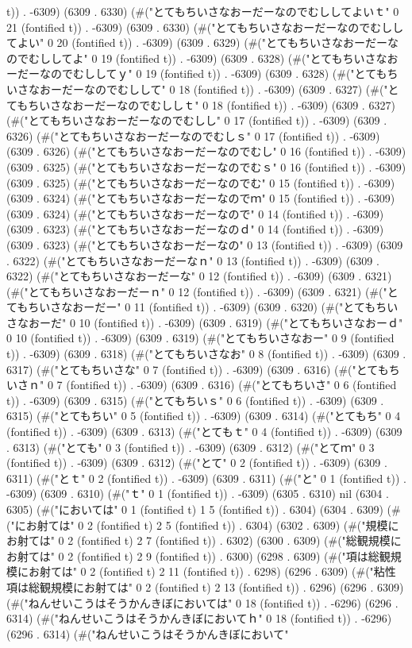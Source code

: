 t)) . -6309) (6309 . 6330) (#("とてもちいさなおーだーなのでむししてよいｔ" 0 21 (fontified t)) . -6309) (6309 . 6330) (#("とてもちいさなおーだーなのでむししてよい" 0 20 (fontified t)) . -6309) (6309 . 6329) (#("とてもちいさなおーだーなのでむししてよ" 0 19 (fontified t)) . -6309) (6309 . 6328) (#("とてもちいさなおーだーなのでむししてｙ" 0 19 (fontified t)) . -6309) (6309 . 6328) (#("とてもちいさなおーだーなのでむしして" 0 18 (fontified t)) . -6309) (6309 . 6327) (#("とてもちいさなおーだーなのでむししｔ" 0 18 (fontified t)) . -6309) (6309 . 6327) (#("とてもちいさなおーだーなのでむしし" 0 17 (fontified t)) . -6309) (6309 . 6326) (#("とてもちいさなおーだーなのでむしｓ" 0 17 (fontified t)) . -6309) (6309 . 6326) (#("とてもちいさなおーだーなのでむし" 0 16 (fontified t)) . -6309) (6309 . 6325) (#("とてもちいさなおーだーなのでむｓ" 0 16 (fontified t)) . -6309) (6309 . 6325) (#("とてもちいさなおーだーなのでむ" 0 15 (fontified t)) . -6309) (6309 . 6324) (#("とてもちいさなおーだーなのでｍ" 0 15 (fontified t)) . -6309) (6309 . 6324) (#("とてもちいさなおーだーなので" 0 14 (fontified t)) . -6309) (6309 . 6323) (#("とてもちいさなおーだーなのｄ" 0 14 (fontified t)) . -6309) (6309 . 6323) (#("とてもちいさなおーだーなの" 0 13 (fontified t)) . -6309) (6309 . 6322) (#("とてもちいさなおーだーなｎ" 0 13 (fontified t)) . -6309) (6309 . 6322) (#("とてもちいさなおーだーな" 0 12 (fontified t)) . -6309) (6309 . 6321) (#("とてもちいさなおーだーｎ" 0 12 (fontified t)) . -6309) (6309 . 6321) (#("とてもちいさなおーだー" 0 11 (fontified t)) . -6309) (6309 . 6320) (#("とてもちいさなおーだ" 0 10 (fontified t)) . -6309) (6309 . 6319) (#("とてもちいさなおーｄ" 0 10 (fontified t)) . -6309) (6309 . 6319) (#("とてもちいさなおー" 0 9 (fontified t)) . -6309) (6309 . 6318) (#("とてもちいさなお" 0 8 (fontified t)) . -6309) (6309 . 6317) (#("とてもちいさな" 0 7 (fontified t)) . -6309) (6309 . 6316) (#("とてもちいさｎ" 0 7 (fontified t)) . -6309) (6309 . 6316) (#("とてもちいさ" 0 6 (fontified t)) . -6309) (6309 . 6315) (#("とてもちいｓ" 0 6 (fontified t)) . -6309) (6309 . 6315) (#("とてもちい" 0 5 (fontified t)) . -6309) (6309 . 6314) (#("とてもち" 0 4 (fontified t)) . -6309) (6309 . 6313) (#("とてもｔ" 0 4 (fontified t)) . -6309) (6309 . 6313) (#("とても" 0 3 (fontified t)) . -6309) (6309 . 6312) (#("とてｍ" 0 3 (fontified t)) . -6309) (6309 . 6312) (#("とて" 0 2 (fontified t)) . -6309) (6309 . 6311) (#("とｔ" 0 2 (fontified t)) . -6309) (6309 . 6311) (#("と" 0 1 (fontified t)) . -6309) (6309 . 6310) (#("ｔ" 0 1 (fontified t)) . -6309) (6305 . 6310) nil (6304 . 6305) (#("においては" 0 1 (fontified t) 1 5 (fontified t)) . 6304) (6304 . 6309) (#("にお射ては" 0 2 (fontified t) 2 5 (fontified t)) . 6304) (6302 . 6309) (#("規模にお射ては" 0 2 (fontified t) 2 7 (fontified t)) . 6302) (6300 . 6309) (#("総観規模にお射ては" 0 2 (fontified t) 2 9 (fontified t)) . 6300) (6298 . 6309) (#("項は総観規模にお射ては" 0 2 (fontified t) 2 11 (fontified t)) . 6298) (6296 . 6309) (#("粘性項は総観規模にお射ては" 0 2 (fontified t) 2 13 (fontified t)) . 6296) (6296 . 6309) (#("ねんせいこうはそうかんきぼにおいては" 0 18 (fontified t)) . -6296) (6296 . 6314) (#("ねんせいこうはそうかんきぼにおいてｈ" 0 18 (fontified t)) . -6296) (6296 . 6314) (#("ねんせいこうはそうかんきぼにおいて" 